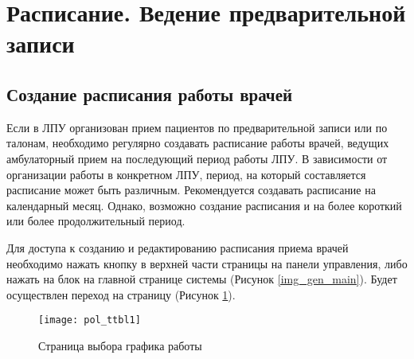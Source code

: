 \newpage
\section{Расписание. Ведение предварительной записи}

{
\subsection{Создание расписания работы врачей} \label{pol_ttbl_new}

Если в ЛПУ организован прием пациентов по предварительной записи или по талонам, необходимо регулярно создавать расписание работы врачей, ведущих амбулаторный прием на последующий период работы ЛПУ. В зависимости от организации работы в конкретном ЛПУ, период, на который составляется расписание может быть различным. Рекомендуется создавать расписание на календарный месяц. Однако, возможно создание расписания и на более короткий или более продолжительный период.

Для доступа к созданию и редактированию расписания приема врачей необходимо нажать кнопку  в верхней части страницы на панели управления, либо нажать на блок  на главной странице системы (Рисунок \ref{img_gen_main}). Будет осуществлен переход на страницу  (Рисунок \ref{img_pol_ttbl1}).
}{}

\begin{figure}[ht]\centering
 \texttt{[image: pol\_ttbl1]}
 \caption{Страница выбора графика работы}
 \label{img_pol_ttbl1}
\end{figure}

